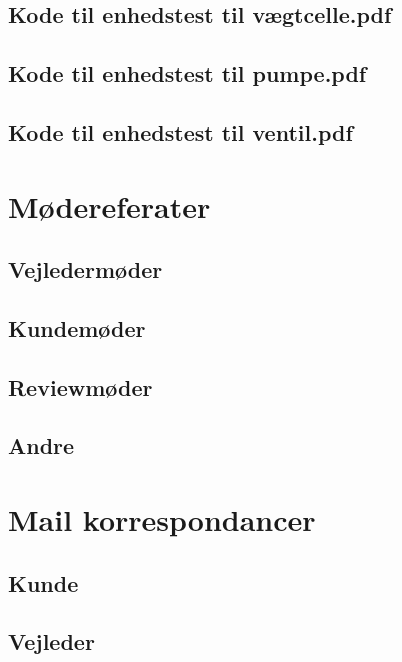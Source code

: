 \subsection{Kode til enhedstest til vægtcelle.pdf} 
\label{bilag:TKloadcell}


\subsection{Kode til enhedstest til pumpe.pdf}
\label{bilag:TKpumpe}

\subsection{Kode til enhedstest til ventil.pdf}
\label{bilag:TKventil}

\section{Mødereferater}
\label{mode}

\subsection{Vejledermøder}
\label{modevejleder}

\subsection{Kundemøder}
\label{modekunde}

\subsection{Reviewmøder}
\label{moderefreview}

\subsection{Andre}
\label{moderefAndre}

\section{Mail korrespondancer}
\label{mails}

\subsection{Kunde}
\label{mailKunde}

\subsection{Vejleder}
\label{mailvejleder}


